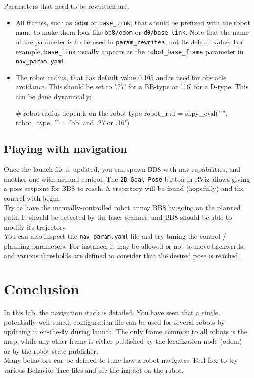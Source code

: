 \documentclass{ecnreport}
\begin{document}
Parameters that need to be rewritten are:
\begin{itemize}
 \item All frames, such as \texttt{odom} or \texttt{base\_link}, that should be prefixed with the robot name to make them look like \texttt{bb8/odom} or \texttt{d0/base\_link}. Note that the name of the parameter is to be used in \texttt{param\_rewrites}, not its default value. For example, \texttt{base\_link} usually appears as the \texttt{robot\_base\_frame} parameter in \texttt{nav\_param.yaml}.
 \item The robot radius, that has default value 0.105 and is used for obstacle avoidance. This should be set to '.27' for a BB-type or '.16' for a D-type. This can be done dynamically:
\begin{pythoncodelarge}
# robot radius depends on the robot type
robot_rad = sl.py_eval("'", robot_type, "'=='bb' and .27 or .16")
\end{pythoncodelarge}
\end{itemize}

\subsection{Playing with navigation}

Once the launch file is updated, you can spawn BB8 with nav capabilities, and another one with manual control. The \texttt{2D Goal Pose} button in RViz allows giving a pose setpoint for BB8 to reach. A trajectory will be found (hopefully) and the control with begin.\\

Try to have the manually-controlled robot annoy BB8 by going on the planned path. It should be detected by the laser scanner, and BB8 should be able to modify its trajectory.\\

You can also inspect the \texttt{nav\_param.yaml} file and try tuning the control / planning parameters. For instance, it may be allowed or not to move backwards, and various thresholds are defined to consider that the desired pose is reached.


\section{Conclusion}

In this lab, the navigation stack is detailed. You have seen that a single, potentially well-tuned, configuration file can be used for several robots by updating it on-the-fly during launch. The only frame common to all robots is the map, while any other frame is either published by the localization node (odom) or by the robot state publisher. \\

Many behaviors can be defined to tune how a robot navigates. Feel free to try various Behavior Tree files and see the impact on the robot.
\end{document}
